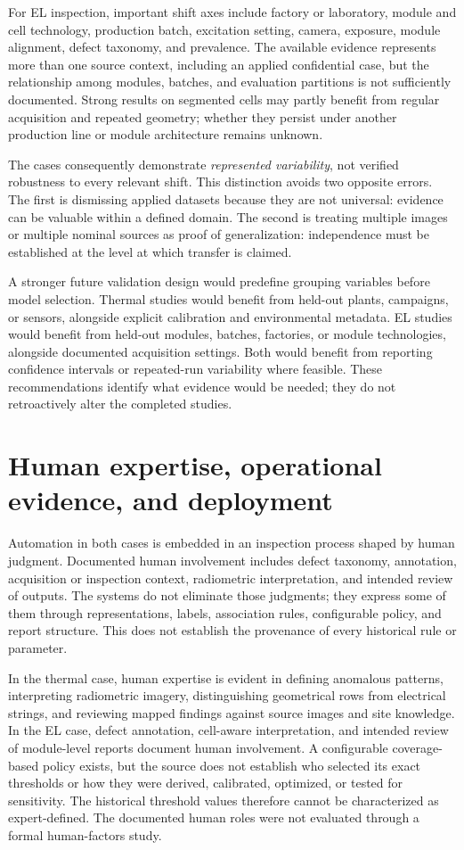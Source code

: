 \documentclass[12pt,a4paper]{report}
\begin{document}
For EL inspection, important shift axes include factory or laboratory, module and cell technology, production batch, excitation setting, camera, exposure, module alignment, defect taxonomy, and prevalence. The available evidence represents more than one source context, including an applied confidential case, but the relationship among modules, batches, and evaluation partitions is not sufficiently documented. Strong results on segmented cells may partly benefit from regular acquisition and repeated geometry; whether they persist under another production line or module architecture remains unknown.

The cases consequently demonstrate \emph{represented variability}, not verified robustness to every relevant shift. This distinction avoids two opposite errors. The first is dismissing applied datasets because they are not universal: evidence can be valuable within a defined domain. The second is treating multiple images or multiple nominal sources as proof of generalization: independence must be established at the level at which transfer is claimed.

A stronger future validation design would predefine grouping variables before model selection. Thermal studies would benefit from held-out plants, campaigns, or sensors, alongside explicit calibration and environmental metadata. EL studies would benefit from held-out modules, batches, factories, or module technologies, alongside documented acquisition settings. Both would benefit from reporting confidence intervals or repeated-run variability where feasible. These recommendations identify what evidence would be needed; they do not retroactively alter the completed studies.

\section{Human expertise, operational evidence, and deployment}
\label{sec:ch07-human-operation}

Automation in both cases is embedded in an inspection process shaped by human judgment. Documented human involvement includes defect taxonomy, annotation, acquisition or inspection context, radiometric interpretation, and intended review of outputs. The systems do not eliminate those judgments; they express some of them through representations, labels, association rules, configurable policy, and report structure. This does not establish the provenance of every historical rule or parameter.

In the thermal case, human expertise is evident in defining anomalous patterns, interpreting radiometric imagery, distinguishing geometrical rows from electrical strings, and reviewing mapped findings against source images and site knowledge. In the EL case, defect annotation, cell-aware interpretation, and intended review of module-level reports document human involvement. A configurable coverage-based policy exists, but the source does not establish who selected its exact thresholds or how they were derived, calibrated, optimized, or tested for sensitivity. The historical threshold values therefore cannot be characterized as expert-defined. The documented human roles were not evaluated through a formal human-factors study.
\end{document}
